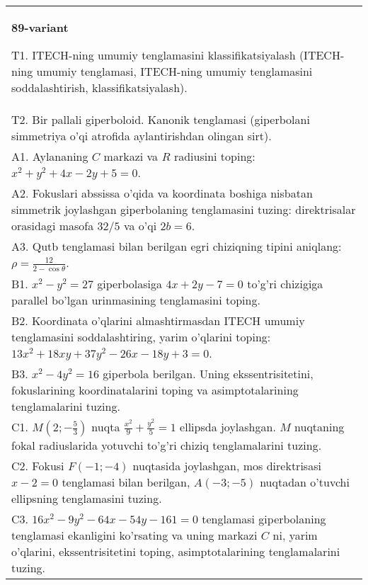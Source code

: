 \documentclass{article}
\begin{document}
\begin{tabular}{m{17cm}}
\textbf{89-variant}
\newline

T1. ITECH-ning umumiy tenglamasini klassifikatsiyalash (ITECH-ning umumiy tenglamasi, ITECH-ning umumiy tenglamasini soddalashtirish, klassifikatsiyalash).\\

T2. Bir pallali giperboloid. Kanonik tenglamasi (giperbolani simmetriya o'qi atrofida aylantirishdan olingan sirt).\\

A1. Aylananing $C$ markazi va $R$ radiusini toping: $x^2+y^2+4x-2y+5=0$.\\

A2. Fokuslari abssissa o'qida va koordinata boshiga nisbatan simmetrik joylashgan giperbolaning tenglamasini tuzing: direktrisalar orasidagi masofa $32/5$ va o'qi $2b=6$.\\

A3. Qutb tenglamasi bilan berilgan egri chiziqning tipini aniqlang: $\rho=\frac{12}{2-\cos\theta}$.\\

B1. $x^{2} - y^{2} = 27$ giperbolasiga $4x + 2y - 7 = 0$ to'g'ri chizigiga parallel bo'lgan urinmasining tenglamasini toping.  \\

B2. Koordinata o'qlarini almashtirmasdan ITECH umumiy tenglamasini soddalashtiring, yarim o'qlarini toping: $13x^{2} + 18xy + 37y^{2} - 26x - 18y + 3 = 0$.  \\

B3. $x^{2} - 4y^{2} = 16$ giperbola berilgan. Uning ekssentrisitetini, fokuslarining koordinatalarini toping va asimptotalarining tenglamalarini tuzing.\\

C1. $M(2; - \frac{5}{3})$ nuqta $\frac{x^{2}}{9} + \frac{y^{2}}{5} = 1$ ellipsda joylashgan. $M$ nuqtaning fokal radiuslarida yotuvchi to'g'ri chiziq tenglamalarini tuzing.  \\

C2. Fokusi $F( - 1; - 4)$ nuqtasida joylashgan, mos direktrisasi $x - 2 = 0$ tenglamasi bilan berilgan, $A( - 3; - 5)$ nuqtadan o'tuvchi ellipsning tenglamasini tuzing.  \\

C3. $16x^{2} - 9y^{2} - 64x - 54y - 161 = 0$ tenglamasi giperbolaning tenglamasi ekanligini ko'rsating va uning markazi $C$ ni, yarim o'qlarini, ekssentrisitetini toping, asimptotalarining tenglamalarini tuzing.  \\

\end{tabular}
\vspace{1cm}
\end{document}
